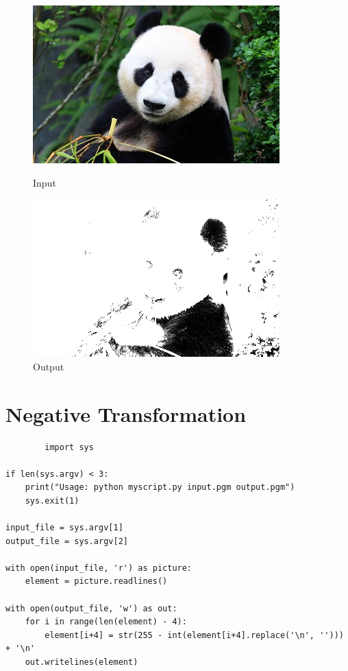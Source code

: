 \documentclass[a4paper,8pt]{article}
\begin{document}
        \begin{figure}[H]
        \centering
        \begin{minipage}{0.4\linewidth}
        \centering
        \includegraphics[width=\linewidth]{output/input1.jpg}
        \caption{Input}
        \end{minipage}
        \hfill
        \begin{minipage}{0.4\linewidth}
        \centering
        \includegraphics[width=\linewidth]{output/Power Law Transformation_output.png}
        \caption{Output}
        \end{minipage}
        \end{figure}
        \clearpage
        
        \section{Negative Transformation}
        \begin{verbatim}
        import sys

if len(sys.argv) < 3:
    print("Usage: python myscript.py input.pgm output.pgm")
    sys.exit(1)

input_file = sys.argv[1]
output_file = sys.argv[2]

with open(input_file, 'r') as picture:
    element = picture.readlines()

with open(output_file, 'w') as out:
    for i in range(len(element) - 4):
        element[i+4] = str(255 - int(element[i+4].replace('\n', ''))) + '\n'
    out.writelines(element)


        \end{verbatim}
        
\end{document}
